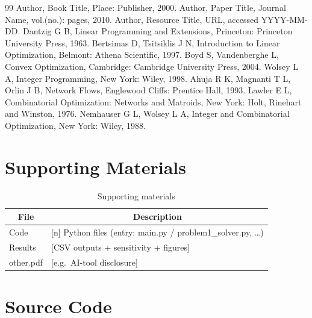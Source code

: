 \documentclass{swmcmthesis}
\begin{document}

\begin{thebibliography}{99}
 Author, Book Title, Place: Publisher, 2000.
 Author, Paper Title, Journal Name, vol.(no.): pages, 2010.
 Author, Resource Title, URL, accessed YYYY-MM-DD.
 Dantzig G B, Linear Programming and Extensions, Princeton: Princeton University Press, 1963.
 Bertsimas D, Tsitsiklis J N, Introduction to Linear Optimization, Belmont: Athena Scientific, 1997.
 Boyd S, Vandenberghe L, Convex Optimization, Cambridge: Cambridge University Press, 2004.
 Wolsey L A, Integer Programming, New York: Wiley, 1998.
 Ahuja R K, Magnanti T L, Orlin J B, Network Flows, Englewood Cliffs: Prentice Hall, 1993.
 Lawler E L, Combinatorial Optimization: Networks and Matroids, New York: Holt, Rinehart and Winston, 1976.
 Nemhauser G L, Wolsey L A, Integer and Combinatorial Optimization, New York: Wiley, 1988.
\end{thebibliography}

\clearpage
\appendix
\section{Supporting Materials}
\label{appendix:start}

\begin{table}[H]
\centering
\caption{Supporting materials}
\label{tab:support}
\begin{tabular}{p{5cm}p{9cm}}
\toprule
\multicolumn{1}{c}{File} & \multicolumn{1}{c}{Description} \\
\midrule
Code & [n] Python files (entry: main.py / problem1\_solver.py, \ldots) \\
Results & [CSV outputs + sensitivity + figures] \\
{other.pdf} & [e.g.\ AI-tool disclosure] \\
\bottomrule
\end{tabular}
\end{table}

\section{Source Code}
\end{document}
